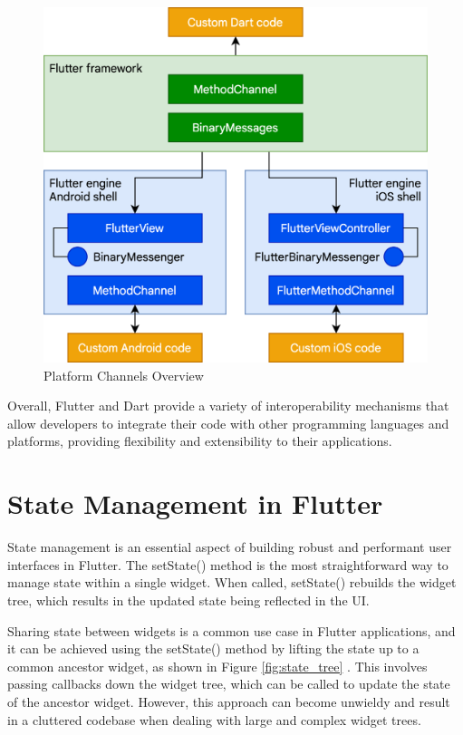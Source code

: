 \documentclass[conference]{IEEEtran}
\begin{document}
\begin{figure}[ht]
	\centerline{\includegraphics[width=\linewidth]{figures/platform-channels}}
	\caption{Platform Channels Overview \cite{b1.1}}
	\label{fig:platform-channels}
\end{figure}

Overall, Flutter and Dart provide a variety of interoperability mechanisms that allow developers to integrate their code with other programming languages and platforms, providing flexibility and extensibility to their applications.


\section{State Management in Flutter}
State management is an essential aspect of building robust and performant user interfaces in Flutter. The setState() method is the most straightforward way to manage state within a single widget. When called, setState() rebuilds the widget tree, which results in the updated state being reflected in the UI.

Sharing state between widgets is a common use case in Flutter applications, and it can be achieved using the setState() method by lifting the state up to a common ancestor widget, as shown in Figure \ref{fig:state_tree} . This involves passing callbacks down the widget tree, which can be called to update the state of the ancestor widget. However, this approach can become unwieldy and result in a cluttered codebase when dealing with large and complex widget trees.
\end{document}
